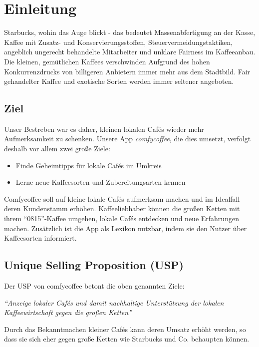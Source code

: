 \chapter{Einleitung}
\label{einleitung}
Starbucks, wohin das Auge blickt - das bedeutet Massenabfertigung an der Kasse, Kaffee mit Zusatz- und Konservierungsstoffen, Steuervermeidungstaktiken, angeblich ungerecht behandelte Mitarbeiter und unklare Fairness im Kaffeeanbau. Die kleinen, gemütlichen Kaffees verschwinden Aufgrund des hohen Konkurrenzdrucks von billigeren Anbietern immer mehr aus dem Stadtbild. Fair gehandelter Kaffee und exotische Sorten werden immer seltener angeboten.

\section{Ziel}
Unser Bestreben war es daher, kleinen lokalen Cafés wieder mehr Aufmerksamkeit zu schenken. Unsere App \emph{comfycoffee}, die dies umsetzt, verfolgt deshalb vor allem zwei große Ziele:
\begin{itemize}
	\item Finde Geheimtipps für lokale Cafés im Umkreis
	\item Lerne neue Kaffeesorten und Zubereitungsarten kennen
\end{itemize}
Comfycoffee soll auf kleine lokale Cafés aufmerksam machen und im Idealfall deren Kundenstamm erhöhen. Kaffeeliebhaber können die großen Ketten mit ihrem ``0815''-Kaffee umgehen, lokale Cafés entdecken und neue Erfahrungen machen. Zusätzlich ist die App als Lexikon nutzbar, indem sie den Nutzer über Kaffeesorten informiert.

\section{Unique Selling Proposition (USP)}
Der USP von comfycoffee betont die oben genannten Ziele:

\begin{center}
\emph{``Anzeige lokaler Cafés und damit nachhaltige Unterstützung der lokalen Kaffeewirtschaft gegen die großen Ketten''}
\end{center}

Durch das Bekanntmachen kleiner Cafés kann deren Umsatz erhöht werden, so dass sie sich eher gegen große Ketten wie Starbucks und Co. behaupten können.